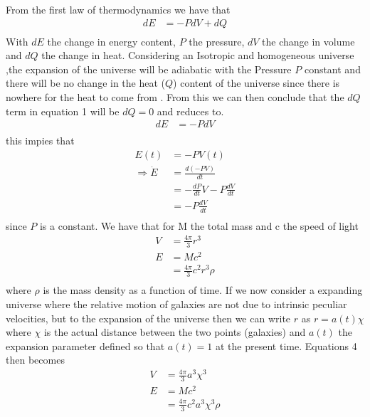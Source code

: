 \documentclass[a4paper, 11pt]{FSKH_623_Report}
\numberwithin{equation}{section}
\newcommand{\driv}[2]{\frac{d #1}{d #2}}
\begin{document}
From the first law of thermodynamics we have that  
\begin{equation}
\begin{split}
dE &= -PdV + dQ\\
\end{split}
\end{equation}
With $dE$ the change in energy content, $P$ the pressure, $dV$ the change in volume and $dQ$ the change in heat.
Considering an Isotropic and homogeneous universe \citep{notes4},the expansion of the universe will be adiabatic with the Pressure $P$ constant and there will be no change in the heat ($Q$) content of the universe since there is nowhere for the heat to come from \citep{notes4}. From this we can then conclude that the $dQ$ term in equation 1 will be $dQ=0$ and reduces to.
\begin{equation}
\begin{split}
dE &= -PdV \\
\end{split}
\end{equation}
this impies that
\begin{equation}
\begin{split}
E(t) &= -PV(t)\\
\Rightarrow \dot{E} &= \frac{d\left(-PV\right)}{dt}\\
&= -\driv{P}{t}V-P\driv{V}{t}\\
&= -P\driv{V}{t}             \\
\end{split}
\end{equation}
since $P$ is a constant.
We have that for M the total mass and c the speed of light 
\begin{equation}
\begin{split}
V &= \frac{4\pi}{3}r^{3}\\
E &= Mc^{2}\\
&=\frac{4\pi}{3}c^{2}r^{3}\rho\\
\end{split}
\end{equation}
where $\rho$ is the mass density as a function of time.
If we now consider a expanding universe where the relative motion of galaxies are not due to intrinsic peculiar velocities, but to the expansion of the universe then we can write $r$ as $r=a(t)\chi$ where $\chi$ is the actual distance between the two points (galaxies) and $a(t)$ the expansion parameter defined so that $a(t)=1$ at the present time. Equations 4 then becomes
\begin{equation}
\begin{split}
V &= \frac{4\pi}{3}a^{3}\chi^{3}\\
E &= Mc^{2}\\
&=\frac{4\pi}{3}c^{2}a^{3}\chi^{3}\rho\\
\end{split}
\end{equation}
\end{document}

